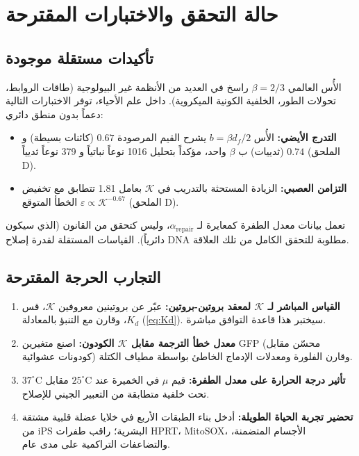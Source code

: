 \documentclass[11pt,a4paper]{article}
\newcommand{\REL}{\mathcal{K}}
\begin{document}
	\section{حالة التحقق والاختبارات المقترحة}
	\label{sec:validation}
	
	\subsection{تأكيدات مستقلة موجودة}
	الأُس العالمي \(\beta = 2/3\) راسخ في العديد من الأنظمة غير البيولوجية (طاقات الروابط، تحولات الطور، الخلفية الكونية الميكروية). داخل علم الأحياء، توفر الاختبارات التالية دعماً بدون منطق دائري:
	\begin{itemize}
		\item \textbf{التدرج الأيضي:} الأُس \(b = \beta d_f/2\) يشرح القيم المرصودة \(0.67\) (كائنات بسيطة) و \(0.74\) (ثدييات) ب \(\beta\) واحد، مؤكداً بتحليل 1016 نوعاً نباتياً و 379 نوعاً ثديياً (الملحق D).
		\item \textbf{التزامن العصبي:} الزيادة المستحثة بالتدريب في \(\REL\) بعامل 1.81 تتطابق مع تخفيض الخطأ المتوقع \(\varepsilon \propto \REL^{-0.67}\) (الملحق D).
	\end{itemize}
	تعمل بيانات معدل الطفرة كمعايرة لـ \(\alpha_{\mathrm{repair}}\)، وليس كتحقق من القانون (الذي سيكون دائرياً). القياسات المستقلة لقدرة إصلاح DNA مطلوبة للتحقق الكامل من تلك العلاقة.
	
	\subsection{التجارب الحرجة المقترحة}
	\begin{enumerate}
		\item \textbf{القياس المباشر لـ \(\REL\) لمعقد بروتين-بروتين:} عبّر عن بروتينين معروفين \(\REL\)، قس \(K_d\)، وقارن مع التنبؤ بالمعادلة (\ref{eq:Kd}). سيختبر هذا قاعدة التوافق مباشرة.
		\item \textbf{معدل خطأ الترجمة مقابل \(\REL\) الكودون:} اصنع متغيرين GFP (محسّن مقابل كودونات عشوائية) وقارن الفلورة ومعدلات الإدماج الخاطئ بواسطة مطياف الكتلة.
		\item \textbf{تأثير درجة الحرارة على معدل الطفرة:} قيم \(\mu\) في الخميرة عند \(25^\circ\text{C}\) مقابل \(37^\circ\text{C}\) تحت خلفية متطابقة من التعبير الجيني للإصلاح.
		\item \textbf{تحضير تجربة الحياة الطويلة:} أدخل بناء الطبقات الأربع في خلايا عضلة قلبية مشتقة من iPS البشرية؛ راقب طفرات HPRT، MitoSOX، الأجسام المتضمنة، والتضاعفات التراكمية على مدى عام.
	\end{enumerate}
	
\end{document}
